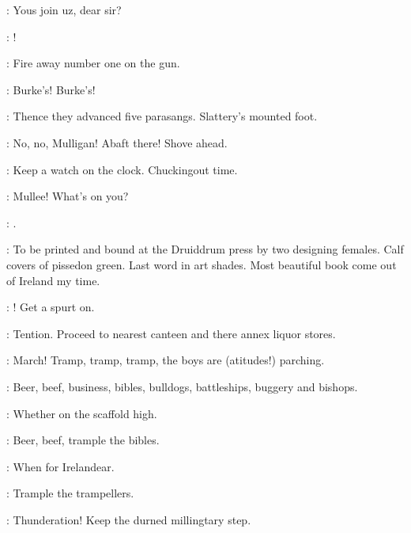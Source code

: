\documentclass[12pt]{article}
\begin{document}





\PC: Yous join uz, dear sir?




\Ba: !

\Ln: Fire away number one on the gun.

\All: Burke's! Burke's!

: Thence they advanced five parasangs. Slattery's mounted foot.



\Ly: No, no, Mulligan! Abaft there! Shove ahead.

\Ln: Keep a watch on the clock. Chuckingout time.

\Md: Mullee! What's on you?

\Mu: .




\SD: To be printed and bound at the Druiddrum press by two designing females.
Calf covers of pissedon green. Last word in art shades.
Most beautiful book come out of Ireland my time.

\Cr: ! Get a spurt on.

\Ln: Tention. Proceed to nearest canteen and there annex liquor stores.

\PC: March! Tramp, tramp, tramp, the boys are (atitudes!) parching.

\Md: Beer, beef, business, bibles, bulldogs, battleships, buggery and bishops.

\Dx: Whether on the scaffold high.

\Md: Beer, beef, trample the bibles.

\Dx: When for Irelandear.

\Cr: Trample the trampellers.

\Ln: Thunderation! Keep the durned millingtary step.
\end{document}
